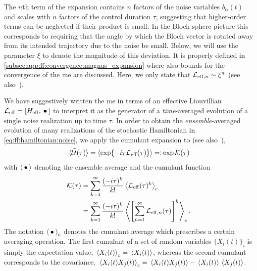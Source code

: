 The $n$th term of the expansion contains $n$ factors of the noise variables $b_\alpha(t)$ and scales with $n$ factors of the control duration $\tau$, suggesting that higher-order terms can be neglected if their product is small.
In the Bloch sphere picture this corresponds to requiring that the angle by which the Bloch vector is rotated away from its intended trajectory due to the noise be small.
Below, we will use the parameter $\xi$ to denote the magnitude of this deviation.
It is properly defined in \cref{subsec:app:ff:convergence:magnus_expansion} where also bounds for the convergence of the \gls{me} are discussed.
Here, we only state that $\mathcal{L}_{\mathrm{eff},n}\sim\xi^n$ (see also~).

We have suggestively written the \gls{me} in terms of an effective Liouvillian $\Li_\mr{eff} = \comm{H_\mr{eff}}{\placeholder}$ to interpret it as the generator of a \emph{time}-averaged evolution of a single noise realization up to time $\tau$.
In order to obtain the \emph{ensemble}-averaged evolution of many realizations of the stochastic Hamiltonian in \cref{eq:ff:hamiltonian:noise}, we apply the cumulant expansion to \liouvUe (see also~),
\begin{equation}\label{eq:ff:cumulant_expansion}
    \liouvUetavg = \ev{\exp\lbrace -\i\tau\Li_\mr{eff}(\tau)\rbrace} \eqqcolon \exp\cumulantfun(\tau)
\end{equation}
with $\ev{\placeholder}$ denoting the ensemble average
and the cumulant function~\cite{Kubo1962}
\begin{align}
    \cumulantfun(\tau) &= \sum_{k=1}^\infty\frac{(-\i\tau)^k}{k!}\ev{\Li_\mr{eff}(\tau)^k}_\mr{c} \\
                       &= \sum_{k=1}^\infty\frac{(-\i\tau)^k}{k!}\ev{\left[\sum_{n=1}^\infty \Li_{\mr{eff},n}(\tau)\right]^k}_\mr{c}. \label{eq:ff:cumulant}
\end{align}
The notation $\ev{\placeholder}_\mr{c}$ denotes the cumulant average which prescribes a certain averaging operation.
The first cumulant of a set of random variables $\{X_i(t)\}_i$ is simply the expectation value, $\ev*{X_i(t)}_\mr{c} = \ev*{X_i(t)}$, whereas the second cumulant corresponds to the covariance, $\ev*{X_i(t)X_j(t)}_\mr{c} = \ev*{X_i(t)X_j(t)} - \ev*{X_i(t)}\ev*{X_j(t)}$.
